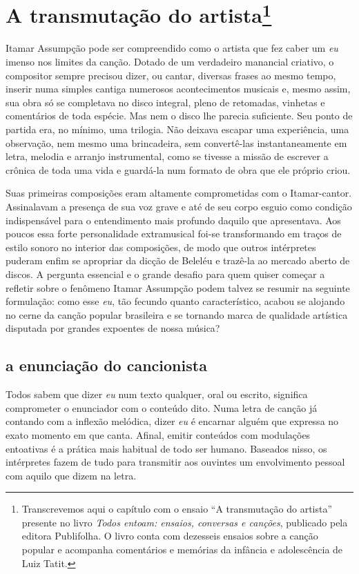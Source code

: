 
\chapter{A transmutação do artista\footnote{Transcrevemos aqui o capítulo com o ensaio ``A transmutação do
artista'' presente no livro \textit{Todos entoam: ensaios, conversas e canções}, publicado pela editora Publifolha.
O livro conta com dezesseis ensaios sobre a canção popular e acompanha comentários e memórias da infância e adolescência de Luiz Tatit.}}


Itamar Assumpção pode ser compreendido como o artista que fez caber um
\textit{eu} imenso nos limites da canção. Dotado de um verdadeiro manancial
criativo, o compositor sempre precisou dizer, ou cantar, diversas frases
ao mesmo tempo, inserir numa simples cantiga numerosos acontecimentos
musicais e, mesmo assim, sua obra só se completava no disco integral,
pleno de retomadas, vinhetas e comentários de toda espécie. Mas nem o
disco lhe parecia suficiente. Seu ponto de partida era, no mínimo, uma
trilogia. Não deixava escapar uma experiência, uma observação, nem mesmo
uma brincadeira, sem convertê-las instantaneamente em letra, melodia e
arranjo instrumental, como se tivesse a missão de escrever a crônica de
toda uma vida e guardá-la num formato de obra que ele próprio criou.

Suas primeiras composições eram altamente comprometidas com o
Itamar-cantor. Assinalavam a presença de sua voz grave e até de seu
corpo esguio como condição indispensável para o entendimento mais
profundo daquilo que apresentava. Aos poucos essa forte personalidade
extramusical foi-se transformando em traços de estilo sonoro no interior
das composições, de modo que outros intérpretes puderam enfim se
apropriar da dicção de Beleléu e trazê-la ao mercado aberto de discos. A
pergunta essencial e o grande desafio para quem quiser começar a
refletir sobre o fenômeno Itamar Assumpção podem talvez se resumir na
seguinte formulação: como esse \textit{eu}, tão fecundo quanto
característico, acabou se alojando no cerne da canção popular brasileira
e se tornando marca de qualidade artística disputada por grandes
expoentes de nossa música?

\section{a enunciação do cancionista}

Todos sabem que dizer \textit{eu} num texto qualquer, oral ou escrito,
significa comprometer o enunciador com o conteúdo dito. Numa letra de
canção já contando com a inflexão melódica, dizer \textit{eu} é encarnar
alguém que expressa no exato momento em que canta. Afinal, emitir
conteúdos com modulações entoativas é a prática mais habitual de todo
ser humano. Baseados nisso, os intérpretes fazem de tudo para transmitir
aos ouvintes um envolvimento pessoal com aquilo que dizem na letra.

